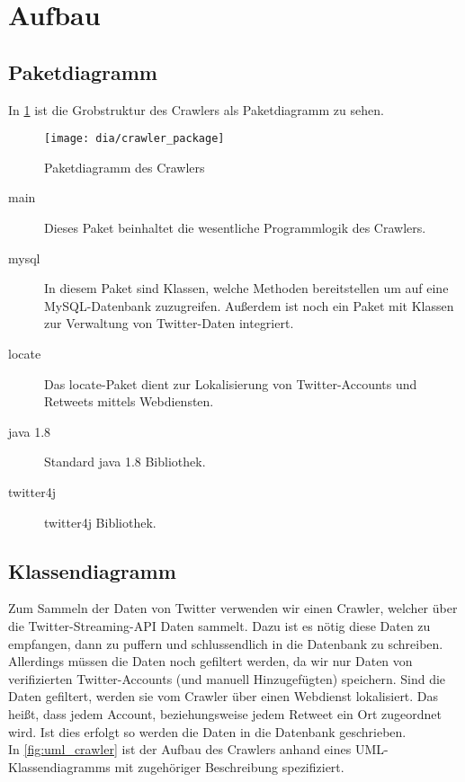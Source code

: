 \section{Aufbau}

\subsection{Paketdiagramm}
In \cref{fig:crawler_package} ist die Grobstruktur des Crawlers als Paketdiagramm zu sehen.
\begin{figure}[h!]
	\centering
	\texttt{[image: dia/crawler\_package]}
	\caption{Paketdiagramm des Crawlers}
	\label{fig:crawler_package}
\end{figure}

\begin{description}
\item[main] Dieses Paket beinhaltet die wesentliche Programmlogik des Crawlers.
\item[mysql] In diesem Paket sind Klassen, welche Methoden bereitstellen um auf eine MySQL-Datenbank zuzugreifen. Außerdem ist noch ein Paket mit Klassen zur Verwaltung von Twitter-Daten integriert.
\item[locate] Das locate-Paket dient zur Lokalisierung von Twitter-Accounts und Retweets mittels Webdiensten.
\item[java 1.8] Standard java 1.8 Bibliothek.
\item[twitter4j] twitter4j Bibliothek.
\end{description}

\subsection{Klassendiagramm}
Zum Sammeln der Daten von Twitter verwenden wir einen Crawler, welcher über die Twitter-Streaming-API Daten sammelt. Dazu ist es nötig diese Daten zu empfangen, dann zu puffern und schlussendlich in die Datenbank zu schreiben. Allerdings müssen die Daten noch gefiltert werden, da wir nur Daten von verifizierten Twitter-Accounts (und manuell Hinzugefügten) speichern. Sind die Daten gefiltert, werden sie vom Crawler über einen Webdienst lokalisiert. Das heißt, dass jedem Account, beziehungsweise jedem Retweet ein Ort zugeordnet wird. Ist dies erfolgt so werden die Daten in die Datenbank geschrieben.
\\ In \cref{fig:uml_crawler} ist der Aufbau des Crawlers anhand eines UML-Klassendiagramms mit zugehöriger Beschreibung spezifiziert.\\

